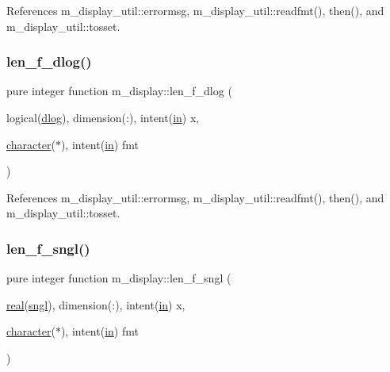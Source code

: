 References m\+\_\+display\+\_\+util\+::errormsg, m\+\_\+display\+\_\+util\+::readfmt(), then(), and m\+\_\+display\+\_\+util\+::tosset.

\mbox{\label{namespacem__display_a2a298a8f2faf00047152b93cd265d396}} 
\subsubsection{\texorpdfstring{len\+\_\+f\+\_\+dlog()}{len\_f\_dlog()}}
{\footnotesize\ttfamily pure integer function m\+\_\+display\+::len\+\_\+f\+\_\+dlog (\begin{DoxyParamCaption}\item[{logical(\hyperlink{namespacem__display_a8c6a3df510feabf6bc84dd0a8789f98c}{dlog}), dimension(\+:), intent(\hyperlink{M__journal_83_8txt_afce72651d1eed785a2132bee863b2f38}{in})}]{x,  }\item[{\hyperlink{option__stopwatch_83_8txt_abd4b21fbbd175834027b5224bfe97e66}{character}($\ast$), intent(\hyperlink{M__journal_83_8txt_afce72651d1eed785a2132bee863b2f38}{in})}]{fmt }\end{DoxyParamCaption})\hspace{0.3cm}{\ttfamily [private]}}



References m\+\_\+display\+\_\+util\+::errormsg, m\+\_\+display\+\_\+util\+::readfmt(), then(), and m\+\_\+display\+\_\+util\+::tosset.

\mbox{\label{namespacem__display_ae0feb946fbc4c31f8ba53e20719fa508}} 
\subsubsection{\texorpdfstring{len\+\_\+f\+\_\+sngl()}{len\_f\_sngl()}}
{\footnotesize\ttfamily pure integer function m\+\_\+display\+::len\+\_\+f\+\_\+sngl (\begin{DoxyParamCaption}\item[{\hyperlink{read__watch_83_8txt_abdb62bde002f38ef75f810d3a905a823}{real}(\hyperlink{namespacem__display_a2ac86bc535c3ccc5947dbb3109c666b5}{sngl}), dimension(\+:), intent(\hyperlink{M__journal_83_8txt_afce72651d1eed785a2132bee863b2f38}{in})}]{x,  }\item[{\hyperlink{option__stopwatch_83_8txt_abd4b21fbbd175834027b5224bfe97e66}{character}($\ast$), intent(\hyperlink{M__journal_83_8txt_afce72651d1eed785a2132bee863b2f38}{in})}]{fmt }\end{DoxyParamCaption})\hspace{0.3cm}{\ttfamily [private]}}



